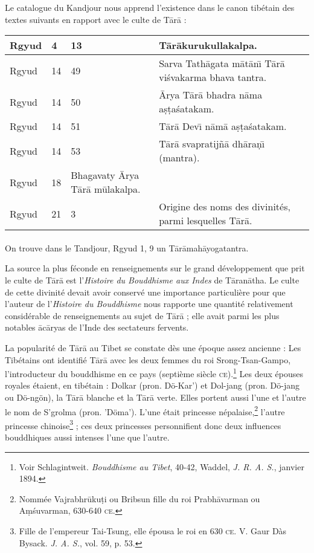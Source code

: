 \documentclass[a4paper, 11pt, oneside, french]{article}
\begin{document}
Le catalogue du Kandjour nous apprend l'existence dans le canon tibétain des textes suivants en rapport avec le culte de T\={a}r\={a} :
\begin{table}[H]
    \centering
    \footnotesize
    \begin{tabular}{|l|l|p{28mm}|p{38mm}|}
    \hline
        Rgyud & 4 & 13 & T\={a}r\={a}kurukullakalpa. \\ \hline
        Rgyud & 14 & 49 & Sarva Tath\={a}gata m\={a}t\={a}n\={\i} T\={a}r\={a} vi\'{s}vakarma bhava tantra. \\ \hline
        Rgyud & 14 & 50 & \={A}rya T\={a}r\={a} bhadra n\={a}ma a\d{s}\d{t}a\'{s}atakam. \\ \hline 
        Rgyud & 14 & 51 & T\={a}r\={a} Dev\={\i} n\={a}m\={a} a\d{s}\d{t}a\'{s}atakam. \\ \hline
        Rgyud & 14 & 53 & T\={a}r\={a} svapratij\~{n}\={a} dh\={a}ra\d{n}\={\i} (mantra). \\ \hline 
        Rgyud & 18 & Bhagavaty \={A}rya T\={a}r\={a} m\={u}lakalpa. & ~ \\ \hline
        Rgyud & 21 & 3 & Origine des noms des divinités, parmi lesquelles T\={a}r\={a}. \\ \hline
    \end{tabular}
\end{table}
\paragraph{}
On trouve dans le Tandjour, Rgyud 1, 9 un T\={a}r\={a}mah\={a}yogatantra.

La source la plus féconde en renseignements sur le grand développement que prit le culte de T\={a}r\={a} est l'\emph{Histoire du Bouddhisme aux Indes} de T\={a}ran\={a}tha. Le culte de cette divinité devait avoir conservé une importance particulière pour que l'auteur de l'\emph{Histoire du Bouddhisme} nous rapporte une quantité relativement considérable de renseignements au sujet de T\={a}r\={a} ; elle avait parmi les plus notables \={a}c\={a}ryas de l'Inde des sectateurs fervents.

La popularité de T\={a}r\={a} au Tibet se constate dès une époque assez ancienne : Les Tibétains ont identifié T\={a}r\={a} avec les deux femmes du roi Srong-Tsan-Gampo, l'introducteur du bouddhisme en ce pays (septième siècle \textsc{ce}).\footnote{Voir Schlagintweit. \emph{Bouddhisme au Tibet}, 40-42, Waddel, \emph{J. R. A. S.}, janvier 1894.} Les deux épouses royales étaient, en tibétain : Dolkar (pron. Dö-Kar') et Dol-jang (pron. Dö-jang ou Dö-ngön), la T\={a}r\={a} blanche et la T\={a}r\={a} verte. Elles portent aussi l'une et l'autre le nom de S'grolma (pron. 'Döma'). L'une était princesse népalaise,\footnote{Nommée Vajrabhr\={u}ku\d{t}i ou Bribsun fille du roi Prabh\={a}varman ou A\d{m}\'{s}uvarman, 630-640 \textsc{ce}.} l'autre princesse chinoise\footnote{Fille de l'empereur Tai-Tsung, elle épousa le roi en 630 \textsc{ce}. V. Gaur Dàs Bysack. \emph{J. A. S.}, vol. 59, p. 53.} ; ces deux princesses personnifient donc deux influences bouddhiques aussi intenses l'une que l'autre.
\end{document}
